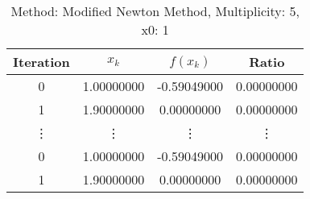 \begin{table}
\centering
\caption{Method: Modified Newton Method, Multiplicity: 5, x0: 1}
\label{tab:table_Modified_Newton_Method_5_1}
\begin{tabular}{c c c c}
\toprule
Iteration &      $x_k$ &    $f(x_k)$ &      Ratio \\
\midrule
        0 & 1.00000000 & -0.59049000 & 0.00000000 \\
        1 & 1.90000000 &  0.00000000 & 0.00000000 \\
   \vdots &     \vdots &      \vdots &     \vdots \\
        0 & 1.00000000 & -0.59049000 & 0.00000000 \\
        1 & 1.90000000 &  0.00000000 & 0.00000000 \\
\bottomrule
\end{tabular}
\end{table}
